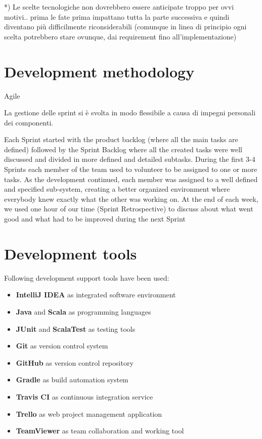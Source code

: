 \documentclass[a4paper,12pt]{report}
\begin{document}
*) Le scelte tecnologiche non dovrebbero essere anticipate troppo per ovvi motivi.. prima le fate prima impattano tutta la parte successiva e quindi diventano più difficilmente riconsiderabili (comunque in linea di principio ogni scelta potrebbero stare ovunque, dai requirement fino all'implementazione) \\



\section{Development methodology}
Agile

La gestione delle sprint si è svolta in modo flessibile a causa di impegni personali dei componenti.

Each Sprint started with the product backlog (where all the main tasks are defined) followed by the Sprint Backlog where all the created tasks were well discussed and divided in more defined and detailed subtasks. During the first 3-4 Sprints each member of the team used to volunteer to be assigned to one or more tasks. As the development continued, each member was assigned to a well defined and specified sub-system, creating a better organized environment where everybody knew exactly what the other was working on. At the end of each week, we used one hour of our time (Sprint Retrospective) to discuss about what went good and what had to be improved during the next Sprint

\section{Development tools}
Following development support tools have been used:

\begin{itemize}
\item \textbf{IntelliJ IDEA} as integrated software environment
\item \textbf{Java} and \textbf{Scala} as programming languages
\item \textbf{JUnit} and \textbf{ScalaTest} as testing tools
\item \textbf{Git} as version control system
\item \textbf{GitHub} as version control repository
\item \textbf{Gradle} as build automation system
\item \textbf{Travis CI} as continuous integration service
\item \textbf{Trello} as web project management application
\item \textbf{TeamViewer} as team collaboration and working tool
\end{itemize}
\end{document}
